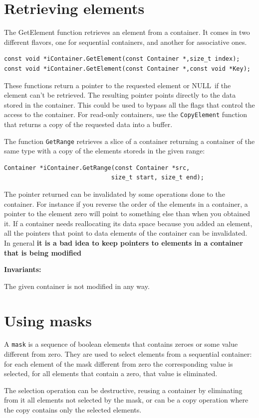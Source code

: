 \documentclass[12pt,a4paper]{memoir} %
\newif\iftth
\newcommand{\Const}{
{\par\noindent \textbf{Invariants:}\noindent}
}
\newcommand{\Null}{{\iftth \ NULL \else \footnotesize NULL\  \fi}}
\begin{document}
\section{Retrieving elements}
The GetElement function retrieves an element from a container. It comes in two different flavors, one for sequential containers, and another for associative ones.
\begin{verbatim}
const void *iContainer.GetElement(const Container *,size_t index);
const void *iContainer.GetElement(const Container *,const void *Key);
\end{verbatim}
These functions return a pointer to the requested element or \Null if the element can't be retrieved. The resulting pointer points directly to the data 
stored in the container. This could be used to bypass all the flags that control the access to the container. For read-only containers, use the 
\texttt{CopyElement} function that returns a copy of the requested data into a buffer.

The function \texttt{GetRange} retrieves a slice of a container returning a container of the same type with a copy of the elements storeds in the
given range: 
\begin{verbatim}
Container *iContainer.GetRange(const Container *src,
                              size_t start, size_t end);
\end{verbatim}

The pointer returned can be invalidated by some operations done to the container. For instance if you reverse the order of the elements in a container, 
a pointer to the element zero will point to something else than when you obtained it. If a container needs reallocating its data space because you
added an element, all the pointers that point to data elements of the container can be invalidated. In general \textbf{it is a bad idea to keep pointers 
to elements in a container that is being modified}
\Const The given container is not modified in any way.
\section{Using masks}
A \verb,mask, is a sequence of boolean elements that contains zeroes or some value different from zero. They are used to select elements from a sequential container: for each element of the mask different from zero the corresponding value is selected, for all elements that contain a zero, that value is eliminated.

The selection operation can be destructive, reusing a container by eliminating from it all elements not selected by the mask, or can be a copy operation where the copy contains only the selected elements.
\end{document}
